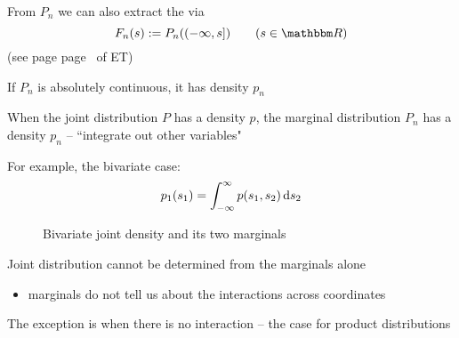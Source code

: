 \begin{frame}

    \vspace{2em}
    From $P_n$ we can also extract the  via 
    \begin{equation*}
        \label{eq:ntf}
        F_{n}(s) := P_{n}( (-\infty, s] )
        \qquad (s \in \RR)
    \end{equation*}
    (see page page~\pageref{ET-eq:ntf} of ET)
    
    \vspace{1em}
    If $P_n$ is absolutely continuous, it has density $p_n$
    
    When the joint
    distribution $P$ has a density $p$, the marginal distribution $P_n$ has a
    density $p_n$ -- ``integrate out
    other variables"
    
    \vspace{.7em}
    For example, the bivariate case:
    \begin{equation*}
        p_1(s_1)
        = \int_{-\infty}^{\infty} p(s_1, s_2) \mathop{}\!\mathrm{d} s_2
    \end{equation*}
    
\end{frame}

\begin{frame}
    
    \vspace{2em}
    \begin{figure}
       \begin{center}
        \caption{\label{f:jointplot} Bivariate joint density and its two marginals}
       \end{center}
    \end{figure}
    
\end{frame}

\begin{frame}

    \vspace{2em}
    Joint distribution cannot be determined from the
    marginals alone
    \begin{itemize}
        \item marginals do not tell us
    about the interactions across coordinates
    \end{itemize} 
    
    \vspace{1em}
    The exception is 
    when there is no interaction -- the case for 
    product distributions 
    
\end{frame}

